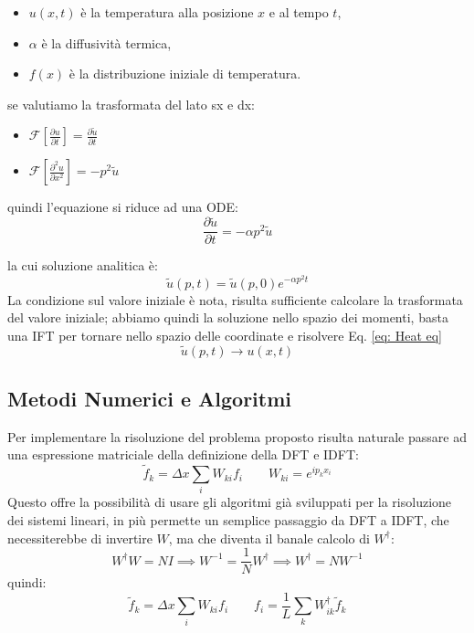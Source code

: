 \documentclass[11pt, a4paper]{article}
\begin{document}
\begin{itemize}
    \item $u(x, t)$ è la temperatura alla posizione $x$ e al tempo $t$,
    \item $\alpha$ è la diffusività termica,
    \item $f(x)$ è la distribuzione iniziale di temperatura.
\end{itemize}

se valutiamo la trasformata del lato sx e dx:
\begin{itemize}
    \item $\mathcal{F} \left[ \frac{\partial u}{\partial t} \right] = \frac{\partial \tilde{u}}{\partial t}$
    \item $\mathcal{F} \left[ \frac{\partial^2 u}{\partial x^2} \right] = -p^2 \tilde{u}$
\end{itemize}

quindi l'equazione si riduce ad una ODE:
\[
\frac{\partial \tilde{u}}{\partial t} = -\alpha p^2 \tilde{u}
\]

la cui soluzione analitica è:
\[
\tilde{u}(p,t) = \tilde{u}(p,0) e^{-\alpha p^2t}
\]
La condizione sul valore iniziale è nota, risulta sufficiente calcolare la trasformata del valore iniziale; abbiamo quindi la soluzione nello spazio dei momenti, basta una IFT per tornare nello spazio delle coordinate e risolvere Eq. \ref{eq: Heat eq}
\[
\tilde{u}(p,t) \longrightarrow u(x,t)
\]

\subsection{Metodi Numerici e Algoritmi}
Per implementare la risoluzione del problema proposto risulta naturale passare ad una espressione matriciale della definizione della DFT e IDFT:
\[
\tilde{f}_k = \Delta x \sum_{i} W_{ki} f_i \quad \quad W_{ki} = e^{i p_k x_i}
\]
Questo offre la possibilità di usare gli algoritmi già sviluppati per la risoluzione dei sistemi lineari, in più permette un semplice passaggio da DFT a IDFT, che necessiterebbe di invertire $W$, ma che diventa il banale calcolo di $W^\dagger$:
$$W^\dagger W = N I \implies W^{-1} = \frac{1}{N} W^\dagger \implies W^\dagger = N W^{-1}$$
quindi:
\[
\tilde{f}_k = \Delta x \sum_{i} W_{ki} f_i \quad \quad f_i = \frac{1}{L} \sum_{k} W^\dagger_{ik} \tilde{f}_k 
\]
\end{document}
